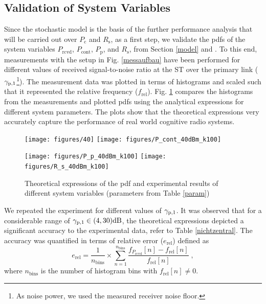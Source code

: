 \subsection{Validation of System Variables}

Since the stochastic model is the basis of the further performance analysis that will be carried out over $P_\textrm{c}$ and $R_\textrm{s}$, as a first step, we validate the pdfs of the system variables $P_\textrm{rcvd}$, $P_\textrm{cont}$, $P_\textrm{p}$, and $R_\textrm{s}$, from Section \ref{model} and \cite{Kaushik15}. To this end, measurements with the setup in Fig. \ref{messaufbau} have been performed for different values of received signal-to-noise ratio at the ST over the primary link (${\gamma}_{\text{p,1}}$\footnote{As noise power, we used the measured receiver noise floor.}). The measurement data was plotted in terms of histograms and scaled such that it represented the relative frequency ($f_\textrm{rel}$). Fig. \ref{hrel_pdf} compares the histograms from the measurements and plotted pdfs using the analytical expressions for different system parameters. The plots show that the theoretical expressions very accurately capture the performance of real world cognitive radio systems.

\begin{figure}
	\centering
	\texttt{[image: figures/40]}%
	\texttt{[image: figures/P\_cont\_40dBm\_k100]}%
	
	\texttt{[image: figures/P\_p\_40dBm\_k100]}%
	\texttt{[image: figures/R\_s\_40dBm\_k100]}%
	\caption{Theoretical expressions of the pdf and experimental results of different system variables (parameters from Table \ref{param})}
	\label{hrel_pdf}
\end{figure}

We repeated the experiment for different values of ${\gamma}_{\text{p,1}}$. It was observed that for a considerable range of ${\gamma}_{\text{p,1}} \in (4,30)\SI{}{dB}$, the theoretical expressions depicted a significant accuracy to the experimental data, refer to Table \ref{nichtzentral}. The accuracy was quantified in terms of relative error ($e_\textrm{rel}$) defined as
\begin{equation}
\label{fr}
e_\textrm{rel} = \frac{1}{n_\textrm{bins}} \times \sum_{n=1}^{n_\textrm{bins}} \frac{f_{P_\textrm{rcvd}}[n] - f_\textrm{rel}[n]}{f_\textrm{rel}[n]} \;  , 
\end{equation}
where $n_\textrm{bins}$ is the number of histogram bins with $f_\textrm{rel}[n] \neq 0$.

